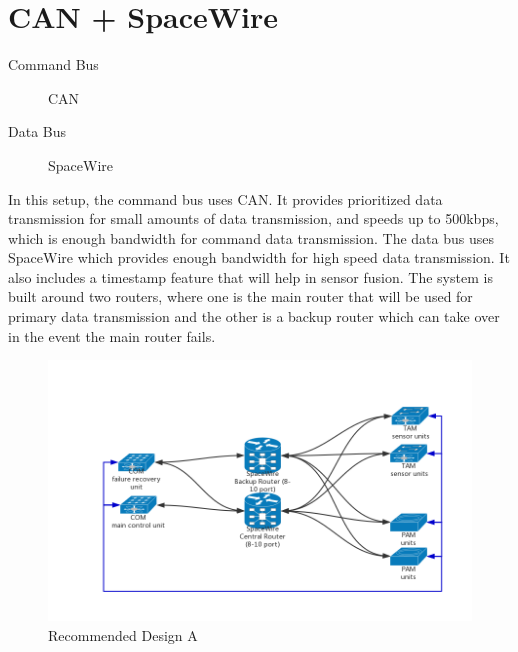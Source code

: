 \documentclass[12pt,article]{memoir}
\begin{document}
\section{CAN + SpaceWire}
\begin{description}
	\item[Command Bus] CAN
	\item[Data Bus] SpaceWire
\end{description}
In this setup, the command bus uses CAN. It provides prioritized data transmission for small amounts of data transmission, and speeds up to 500kbps, which is enough bandwidth for command data transmission. The data bus uses SpaceWire which provides enough bandwidth for high speed data transmission. It also includes a timestamp feature that will help in sensor fusion. The system is built around two routers, where one is the main router that will be used for primary data transmission and the other is a backup router which can take over in the event the main router fails.
\begin{figure}[H]
	\centering
	\includegraphics[width=\textwidth]{img/DR00001_SpaceWire_1.png}
	\caption{Recommended Design A}	
\end{figure}

\newpage
\end{document}
